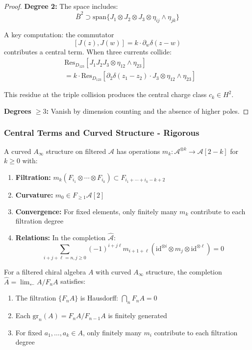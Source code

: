 \begin{proof}
\textbf{Degree 2:} The space includes:
\[
\bar{B}^2 \supset \text{span}\{J_1 \otimes J_2 \otimes J_3 \otimes \eta_{ij} \wedge \eta_{jk}\}
\]
 
A key computation: the commutator
\[
[J(z), J(w)] = k \cdot \partial_w\delta(z-w)
\]
contributes a central term. When three currents collide:
\begin{align}
&\text{Res}_{D_{123}}[J_1J_2J_3 \otimes \eta_{12} \wedge \eta_{23}] \\
&= k \cdot \text{Res}_{D_{123}}[\partial_2\delta(z_1-z_2) \cdot J_3 \otimes \eta_{12} \wedge \eta_{23}]
\end{align}
 
This residue at the triple collision produces the central charge class $c_k \in H^2$.
 
\textbf{Degrees $\geq 3$:} Vanish by dimension counting and the absence of higher poles.
\end{proof}
 
\subsubsection{Central Terms and Curved Structure - Rigorous}

\begin{definition}
A curved $A_\infty$ structure on filtered $\mathcal{A}$ has operations $m_k: \mathcal{A}^{\otimes k} \to \mathcal{A}[2-k]$ for $k \geq 0$ with:
\begin{enumerate}
\item \textbf{Filtration:} $m_k(F_{i_1} \otimes \cdots \otimes F_{i_k}) \subset F_{i_1+\cdots+i_k-k+2}$
\item \textbf{Curvature:} $m_0 \in F_{\geq 1}\mathcal{A}[2]$
\item \textbf{Convergence:} For fixed elements, only finitely many $m_k$ contribute to each filtration degree
\item \textbf{Relations:} In the completion $\widehat{\mathcal{A}}$:
   $$\sum_{i+j+\ell=n, j \geq 0} (-1)^{i+j\ell} m_{i+1+\ell}(\text{id}^{\otimes i} \otimes m_j \otimes \text{id}^{\otimes \ell}) = 0$$
\end{enumerate}
\end{definition}

\begin{proposition}\label{prop:curved-convergence}
For a filtered chiral algebra $A$ with curved $A_\infty$ structure, the completion $\hat{A} = \lim_{\leftarrow} A/F_nA$ satisfies:
\begin{enumerate}
\item The filtration $\{F_nA\}$ is Hausdorff: $\bigcap_n F_nA = 0$
\item Each $\text{gr}_n(A) = F_nA/F_{n-1}A$ is finitely generated
\item For fixed $a_1, \ldots, a_k \in A$, only finitely many $m_i$ contribute to each filtration degree
\end{enumerate}
\end{proposition}

